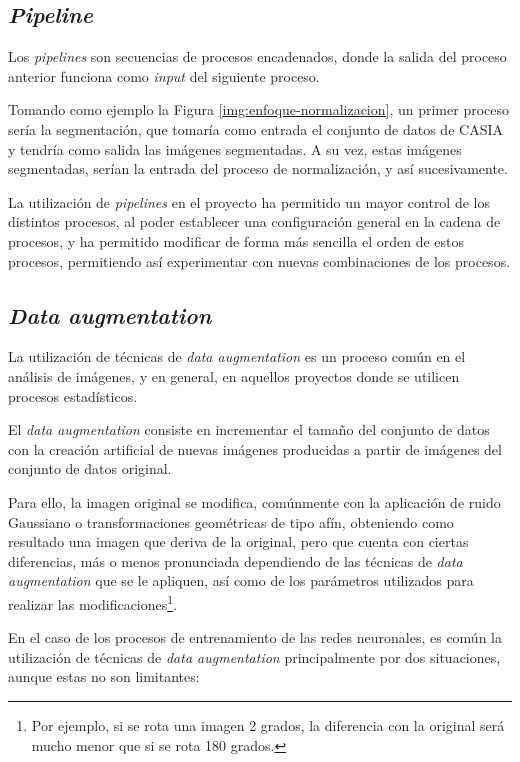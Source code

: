 \subsection{\textit{Pipeline}}

Los \textit{pipelines} son secuencias de procesos encadenados, donde la salida del proceso anterior funciona como \textit{input} del siguiente proceso.

Tomando como ejemplo la Figura \ref{img:enfoque-normalizacion}, un primer proceso sería la segmentación, que tomaría como entrada el conjunto de datos de CASIA y tendría como salida 
las imágenes segmentadas. A su vez, estas imágenes segmentadas, serían la entrada del proceso de normalización, y así sucesivamente.

La utilización de \textit{pipelines} en el proyecto ha permitido un mayor control de los distintos procesos, al poder establecer una configuración general en la cadena de procesos, y ha permitido modificar de forma más sencilla el orden de estos procesos, permitiendo así experimentar con nuevas combinaciones de los procesos.

\subsection{\textit{Data augmentation}}\label{dataaugmentation}

La utilización de técnicas de \textit{data augmentation} es un proceso común en el análisis de imágenes, y en general, en aquellos proyectos donde se utilicen procesos estadísticos. 

El \textit{data augmentation} consiste en incrementar el tamaño del conjunto de datos con la creación artificial de nuevas imágenes producidas a partir de imágenes del conjunto de datos original.

Para ello, la imagen original se modifica, comúnmente con la aplicación de ruido Gaussiano o transformaciones geométricas de tipo afín, obteniendo como resultado una imagen que deriva de la original, pero que cuenta con ciertas diferencias, más o menos pronunciada dependiendo de las técnicas 
de \textit{data augmentation} que se le apliquen, así como de los parámetros utilizados para realizar las modificaciones\footnote{Por ejemplo, si se rota una imagen 2 grados, la diferencia con la original será mucho menor que si se rota 180 grados.}.	

En el caso de los procesos de entrenamiento de las redes neuronales, es común la utilización de técnicas de \textit{data augmentation} principalmente por dos situaciones, aunque estas no son limitantes:

